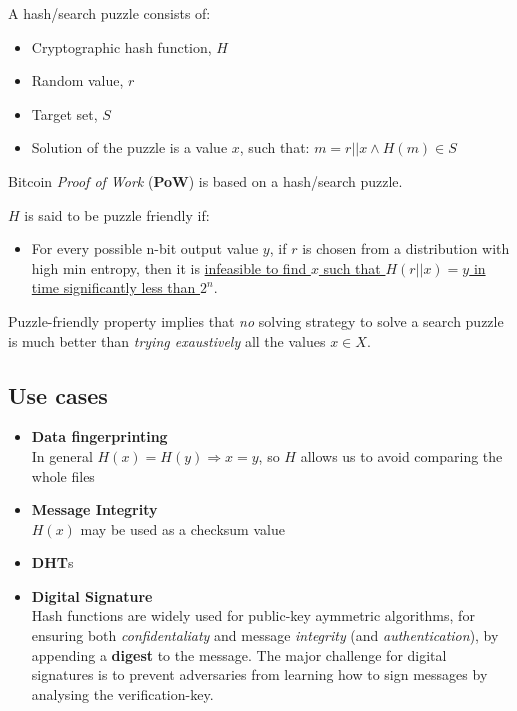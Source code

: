 {A hash/search puzzle consists of:\ns
\begin{itemize}
   \item Cryptographic hash function, $H$
   \item Random value, $r$
   \item Target set, $S$
   \item Solution of the puzzle is a value $x$, such that:
   $m = r || x \wedge H(m) \in S$
\end{itemize}}
Bitcoin \textit{Proof of Work} (\textbf{PoW}) is based on a hash/search puzzle.
\begin{definition}
   $H$ is said to be puzzle friendly if:
   \begin{itemize}
      \item For every possible n-bit output value $y$, if $r$ is chosen from a distribution with high min entropy, then it is \ul{infeasible to find $x$ such that $H(r || x) = y$ in time significantly less than $2^n$}.
   \end{itemize}
\end{definition}
Puzzle-friendly property implies that
\textit{no} solving strategy to solve a search puzzle is much better than \textit{trying exaustively} all the values $x \in X$.

\subsection{Use cases}
\begin{itemize}
   \item \textbf{Data fingerprinting}\\
   In general $H(x) = H(y) \Rightarrow x = y$, so $H$ allows us to avoid comparing the whole files
   \item \textbf{Message Integrity}\\
   $H(x)$ may be used as a checksum value
   \item \textbf{DHT}s
   \item \textbf{Digital Signature}\\
   Hash functions are widely used for public-key aymmetric algorithms, for ensuring both \textit{confidentaliaty} and message \textit{integrity} (and \textit{authentication}), by appending a \textbf{digest} to the message.
   The major challenge for digital signatures is to prevent adversaries from learning how to sign messages by analysing the verification-key.
   
\end{itemize}



